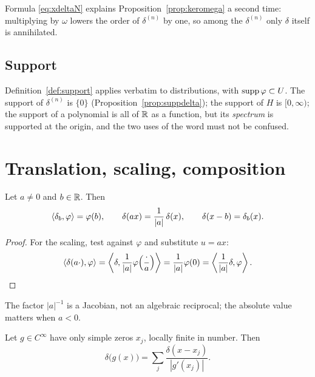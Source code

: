 \begin{remark}
Formula \eqref{eq:xdeltaN} explains Proposition~\ref{prop:keromega} a second time: multiplying by
$\omega$ lowers the order of $\delta^{(n)}$ by one, so among the $\delta^{(n)}$ only $\delta$ itself
is annihilated.
\end{remark}

\subsection*{Support}

Definition~\ref{def:support} applies verbatim to distributions, with $\operatorname{supp}\varphi\subset U$. The
support of $\delta^{(n)}$ is $\{0\}$ (Proposition~\ref{prop:suppdelta}); the support of $H$ is
$[0,\infty)$; the support of a polynomial is all of $\mathbb{R}$ as a function, but its \emph{spectrum} is
supported at the origin, and the two uses of the word must not be confused.

\section{Translation, scaling, composition}

\begin{proposition}\label{prop:affine}
Let $a\neq0$ and $b\in\mathbb{R}$. Then
\begin{equation}
\langle \delta_{b},\varphi\rangle=\varphi(b),
\qquad
\delta(ax)=\frac{1}{|a|}\,\delta(x),
\qquad
\delta(x-b)=\delta_{b}(x).
\label{eq:delta-scale}
\end{equation}
\end{proposition}

\begin{proof}
For the scaling, test against $\varphi$ and substitute $u=ax$:
\begin{equation}
\langle \delta(a\cdot),\varphi\rangle=\left\langle\delta,\frac{1}{|a|}\varphi\!\left(\frac{\cdot}{a}\right)\right\rangle
=\frac{1}{|a|}\varphi(0)=\left\langle\frac{1}{|a|}\delta,\varphi\right\rangle . \qedhere
\end{equation}
\end{proof}

The factor $|a|^{-1}$ is a Jacobian, not an algebraic reciprocal; the absolute value matters when
$a<0$.

\begin{proposition}[composition]\label{prop:composition}
Let $g\in C^{\infty}$ have only simple zeros $x_{j}$, locally finite in number. Then
\begin{equation}
\delta\big(g(x)\big)=\sum_{j}\frac{\delta(x-x_{j})}{|g'(x_{j})|} .
\label{eq:compose}
\end{equation}
\end{proposition}

